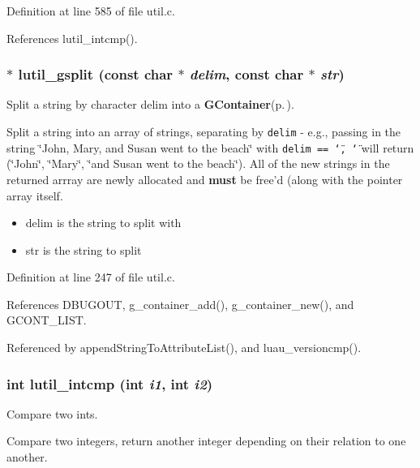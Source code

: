 Definition at line 585 of file util.c.

References lutil\_\-intcmp().
\subsubsection{$\ast$ lutil\_\-gsplit (const char $\ast$ {\em delim}, const char $\ast$ {\em str})}\label{util_8c_a6}


Split a string by character delim into a {\bf GContainer}{\rm (p.\,\pageref{structGContainer})}. 

Split a string into an array of strings, separating by {\tt delim} - e.g., passing in the string \char`\"{}John, Mary, and Susan went to the beach\char`\"{} with {\tt delim == \char`\"{}, \char`\"{}} will return (\char`\"{}John\char`\"{}, \char`\"{}Mary\char`\"{}, \char`\"{}and Susan went to the beach\char`\"{}). All of the new strings in the returned arrray are newly allocated and {\bf must} be free'd (along with the pointer array itself.

\begin{itemize}
\item delim is the string to split with \item str is the string to split 
\end{itemize}


Definition at line 247 of file util.c.

References DBUGOUT, g\_\-container\_\-add(), g\_\-container\_\-new(), and GCONT\_\-LIST.

Referenced by append\-String\-To\-Attribute\-List(), and luau\_\-versioncmp().
\subsubsection{\setlength{\rightskip}{0pt plus 5cm}int lutil\_\-intcmp (int {\em i1}, int {\em i2})}\label{util_8c_a20}


Compare two ints. 

Compare two integers, return another integer depending on their relation to one another.


